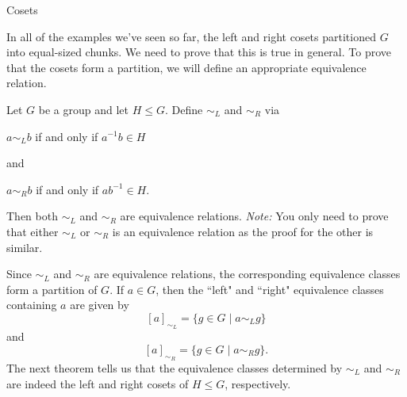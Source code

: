 \begin{section}{Cosets}
%
%

In all of the examples we've seen so far, the left and right cosets partitioned $G$ into equal-sized chunks.  We need to prove that this is true in general.  To prove that the cosets form a partition, we will define an appropriate equivalence relation.

\begin{theorem}
Let $G$ be a group and let $H\leq G$.  Define $\sim_L$ and $\sim_R$ via 
\begin{center}
$a\sim_L b$ if and only if $a^{-1}b\in H$
\end{center}
and
\begin{center}
$a\sim_R b$ if and only if $ab^{-1}\in H$.
\end{center}
Then both $\sim_L$ and $\sim_R$ are equivalence relations. \emph{Note:} You only need to prove that either $\sim_L$ or $\sim_R$ is an equivalence relation as the proof for the other is similar.
\end{theorem}

Since $\sim_L$ and $\sim_R$ are equivalence relations, the corresponding equivalence classes form a partition of $G$. If $a\in G$, then the ``left" and ``right" equivalence classes containing $a$ are given by
\[
[a]_{\sim_L}=\{g\in G\mid a\sim_L g\}
\]
and
\[
[a]_{\sim_R}=\{g\in G\mid a\sim_R g\}.
\]
The next theorem tells us that the equivalence classes determined by $\sim_L$ and $\sim_R$ are indeed the left and right cosets of $H\leq G$, respectively.


\end{section}
